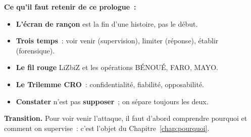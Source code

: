 \begin{boxresume}
\textbf{Ce qu'il faut retenir de ce prologue~:}
\begin{itemize}
    \item \textbf{L'écran de rançon} est la fin d'une histoire, pas le début.
    \item \textbf{Trois temps}~: voir venir (supervision), limiter (réponse),
          établir (forensique).
    \item \textbf{Le fil rouge} LiZbiZ et les opérations BÉNOUÉ, FARO, MAYO.
    \item \textbf{Le Trilemme CRO}~: confidentialité, fiabilité, opposabilité.
    \item \textbf{Constater} n'est pas \textbf{supposer}~; on sépare toujours
          les deux.
\end{itemize}
\end{boxresume}

\begin{boxinfo}
\textbf{Transition.} Pour voir venir l'attaque, il faut d'abord comprendre
pourquoi et comment on supervise~: c'est l'objet du
Chapitre~\ref{chap:pourquoi}.
\end{boxinfo}
